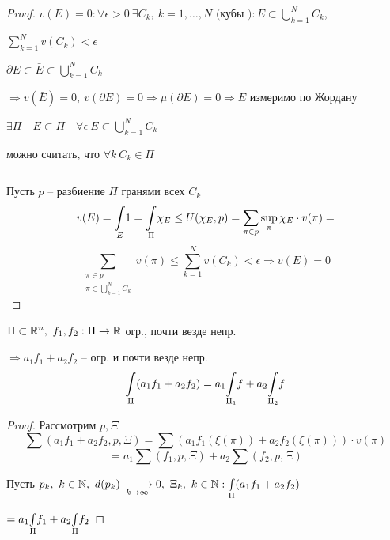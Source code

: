     \begin{proof}
        $v(E) = 0 : \forall \epsilon > 0 \ \exists C_k, \ k = 1, \dots, N \text{ (кубы )} : E \subset \bigcup_{k=1}^N C_k$,
        \par $\sum_{k=1}^N v(C_k) < \epsilon$
        \par $\partial E \subset \bar E \subset \bigcup_{k=1}^N C_k$
        \par $\Rightarrow v(\bar E) = 0, \ v(\partial E) = 0 \Rightarrow \mu(\partial E) = 0 \Rightarrow E$ измеримо по Жордану
        \par $\exists \Pi \quad E \subset \Pi \quad \forall \epsilon \ E \subset \bigcup_{k=1}^N C_k$
        \par \quad можно считать, что $\forall k \ C_k \in \Pi$
        \par $ $
        \par Пусть $p$ -- разбиение $\Pi$ гранями всех $C_k$
        \[
            v(E) = \underset{E}{\int} 1 = \underset{\Pi}{\int} \chi_E \le U(\chi_E, p) = \sum_{\pi \in p} \sup_\pi \chi_E \cdot v(\pi) =  
        \] 
        \[
            \sum_{\begin{aligned}
                \pi \in p \\
                \pi \in \bigcup_{k = 1}^N C_k
            \end{aligned}} v(\pi) \le \sum_{k=1}^N v(C_k) < \epsilon \Rightarrow v(E) = 0
        \]
    \end{proof}

    \begin{lemma}
        $\Pi \subset \mathbb{R}^n , \ f_1, f_2 : \Pi \rightarrow \mathbb{R}$ огр., почти везде непр.
        \par $\Rightarrow a_1f_1 + a_2f_2$ -- огр. и почти везде непр.
        \[
            \underset{\Pi}{\int} (a_1f_1 + a_2f_2) = a_1 \underset{\Pi_1}{\int} f + a_2 \underset{\Pi_2}{\int} f    
        \]
    \end{lemma}
    \begin{proof}
        Рассмотрим $p, \Xi$
        \[
            \sum(a_1f_1 + a_2f_2, p, \Xi) = \sum(a_1f_1(\xi(\pi)) + a_2f_2(\xi(\pi))) \cdot v(\pi)     
        \]
        \[
            = a_1 \sum(f_1, p, \Xi) + a_2\sum(f_2, p, \Xi)    
        \]
        \par Пусть $p_k, \ k \in \mathbb{N}, \ d(p_k) \xrightarrow[k \rightarrow \infty]{} 0, \ \Xi_k, \ k \in \mathbb{N} : \underset{\Pi}{\int}(a_1f_1 + a_2f_2)$
        \par $= a_1 \underset{\Pi}{\int} f_1 + a_2\underset{\Pi}{\int} f_2$
    \end{proof}

